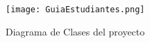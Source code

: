 \begin{figure}[H]
	\centering
	\texttt{[image: GuiaEstudiantes.png]}
	\caption{Diagrama de Clases del proyecto}
\end{figure}
